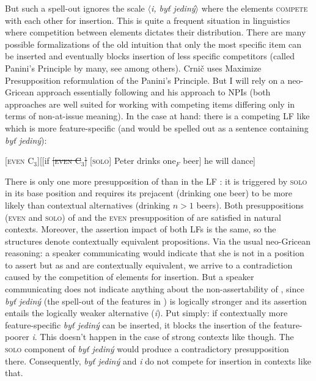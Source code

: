 \documentclass[output=paper,colorlinks,citecolor=brown]{langscibook}
\begin{document}
\ea{}
\z
\z


\noindent But such a spell-out ignores the scale \(\langle\)\emph{i, byť jediný}\(\rangle\) where the elements \textsc{compete} with each other for insertion. This is quite a frequent situation in linguistics where competition between elements dictates their distribution. There are many possible formalizations of the old intuition that only the most specific item can be inserted and eventually blocks insertion of less specific competitors (called Panini's Principle by many, see \citealt{booij2012grammar} among others). Crnič uses  Maximize Presupposition reformulation of the Panini's Principle. But I will rely on a neo-Gricean approach essentially following \citet{krifka1995semantics} and his approach to NPIs (both approaches are well suited for working with competing items differing only in terms of non-at-issue meaning). In the case at hand: there is a competing LF like  which is more feature-specific (and would be spelled out as a sentence containing \emph{byť jediný}):

\ea\label{ex:51}[\textsc{even} C$_3$][[if \sout{[\textsc{even} C$_3$]} [\textsc{solo}] Peter drinks one$_F$ beer] he will dance]
\z

\noindent There is only one more presupposition of  than in the LF : it is triggered by \textsc{solo} in its base position and requires its prejacent (drinking one beer) to be more likely than contextual alternatives (drinking \(n>1\) beers). Both presuppositions (\textsc{even} and \textsc{solo}) of  and the \textsc{even} presupposition of  are satisfied in natural contexts. Moreover, the assertion impact of both LFs is the same, so the structures denote contextually equivalent propositions. Via the usual neo-Gricean reasoning: a speaker communicating  would indicate that she is not in a position to assert  but as  and  are contextually equivalent, we arrive to a contradiction caused by the competition of elements for insertion. But a speaker communicating  does not indicate anything about the non-assertability of , since \emph{byť jediný} (the spell-out of the features in ) is logically stronger and its assertion entails the logically weaker alternative (\emph{i}). Put simply: if contextually more feature-specific \emph{byť jediný} can be inserted, it blocks the insertion of the feature-poorer \emph{i}. This doesn't happen in the case of strong contexts like  though. The \textsc{solo} component of \emph{byť jediný} would produce a contradictory presupposition there. Consequently, \emph{byť jediný} and \emph{i} do not compete for insertion in contexts like that.
\end{document}
